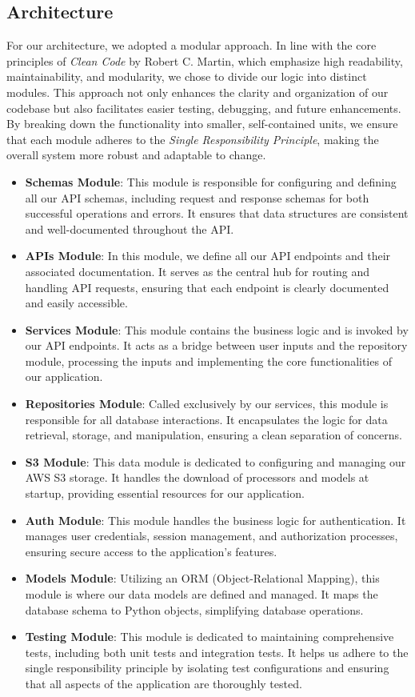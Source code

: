 \subsection{Architecture}
For our architecture, we adopted a modular approach. In line with the core principles of \textit{Clean Code} \cite{clean_code} by Robert C. Martin, which emphasize high readability, maintainability, and modularity, we chose to divide our logic into distinct modules. This approach not only enhances the clarity and organization of our codebase but also facilitates easier testing, debugging, and future enhancements. By breaking down the functionality into smaller, self-contained units, we ensure that each module adheres to the \textit{Single Responsibility Principle}, making the overall system more robust and adaptable to change.

\begin{itemize}
    \item \textbf{Schemas Module}: This module is responsible for configuring and defining all our API schemas, including request and response schemas for both successful operations and errors. It ensures that data structures are consistent and well-documented throughout the API.
    \item \textbf{APIs Module}: In this module, we define all our API endpoints and their associated documentation. It serves as the central hub for routing and handling API requests, ensuring that each endpoint is clearly documented and easily accessible.
    \item \textbf{Services Module}: This module contains the business logic and is invoked by our API endpoints. It acts as a bridge between user inputs and the repository module, processing the inputs and implementing the core functionalities of our application.
    \item \textbf{Repositories Module}: Called exclusively by our services, this module is responsible for all database interactions. It encapsulates the logic for data retrieval, storage, and manipulation, ensuring a clean separation of concerns.
    \item \textbf{S3 Module}: This data module is dedicated to configuring and managing our AWS S3 storage. It handles the download of processors and models at startup, providing essential resources for our application.
    \item \textbf{Auth Module}: This module handles the business logic for authentication. It manages user credentials, session management, and authorization processes, ensuring secure access to the application's features.
    \item \textbf{Models Module}: Utilizing an ORM (Object-Relational Mapping), this module is where our data models are defined and managed. It maps the database schema to Python objects, simplifying database operations.
    \item \textbf{Testing Module}: This module is dedicated to maintaining comprehensive tests, including both unit tests and integration tests. It helps us adhere to the single responsibility principle by isolating test configurations and ensuring that all aspects of the application are thoroughly tested.

\end{itemize}

